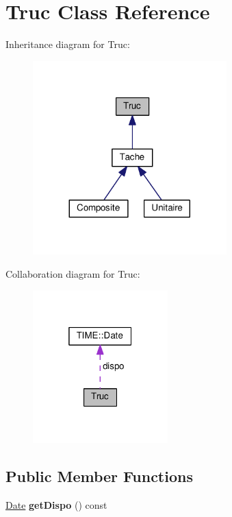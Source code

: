 \hypertarget{class_truc}{}\section{Truc Class Reference}
\label{class_truc}


Inheritance diagram for Truc\+:\nopagebreak
\begin{figure}[H]
\begin{center}
\leavevmode
\includegraphics[width=212pt]{class_truc__inherit__graph}
\end{center}
\end{figure}


Collaboration diagram for Truc\+:\nopagebreak
\begin{figure}[H]
\begin{center}
\leavevmode
\includegraphics[width=148pt]{class_truc__coll__graph}
\end{center}
\end{figure}
\subsection*{Public Member Functions}
\begin{DoxyCompactItemize}
\item 
\hypertarget{class_truc_aca95e48d9dc4a28745998319c0fb6233}{}\hyperlink{class_t_i_m_e_1_1_date}{Date} {\bfseries get\+Dispo} () const \label{class_truc_aca95e48d9dc4a28745998319c0fb6233}

\end{DoxyCompactItemize}
